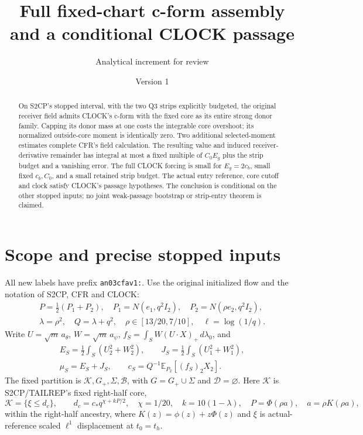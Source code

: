 \documentclass[11pt]{article}
\title{Full fixed-chart c-form assembly\\and a conditional CLOCK passage}
\author{Analytical increment for review}
\date{Version 1}
\theoremstyle{remark}\newtheorem{remark}[theorem]{Remark}
\newcommand{\E}{\mathbb E}
\newcommand{\dd}{\,d}
\newcommand{\KK}{\mathcal K}
\newcommand{\BB}{\mathcal B}
\newcommand{\Gp}{G_+}
\begin{document}
\maketitle
\begin{abstract}
On S2CP's stopped interval, with the two Q3 strips explicitly
budgeted, the original receiver field admits CLOCK's c-form with
the fixed core as its entire strong donor family. Capping its
donor mass at one costs the integrable core overshoot; its
normalized outside-core moment is identically zero. Two additional
selected-moment estimates complete CFR's field calculation.
The resulting value and induced receiver-derivative remainder
has integral at most a fixed multiple of $C_0E_g$ plus the strip
budget and a vanishing error. The full CLOCK forcing is small
for $E_g=2c_b$, small fixed $c_b,C_0$, and a small retained strip
budget. The actual entry reference, core cutoff and clock satisfy
CLOCK's passage hypotheses. The conclusion is conditional on
the other stopped inputs; no joint weak-passage bootstrap or
strip-entry theorem is claimed.
\end{abstract}

\section{Scope and precise stopped inputs}
All new labels have prefix \texttt{an03cfav1:}.
Use the original initialized flow and the notation of S2CP,
CFR and CLOCK:
\[
 \begin{gathered}
 P=\tfrac12(P_1+P_2),\quad P_1=N(e_1,q^2I_2),\quad
 P_2=N(\rho e_2,q^2I_2),\\
 \lambda=\rho^2,\quad Q=\lambda+q^2,\quad
 \rho\in[13/20,7/10],\quad\ell=\log(1/q).
 \end{gathered}
\]
Write $U=\sqrt m\,a_\theta$, $W=\sqrt m\,a_\psi$,
$f_S=\int_S W(U\cdot X)_+\dd\lambda_0$, and
\[
 \begin{gathered}
 E_S=\tfrac12\int_S(U_2^2+W_2^2),\qquad
 J_S=\tfrac12\int_S(U_1^2+W_1^2),\\
 \mu_S=E_S+J_S,\qquad
 c_S=Q^{-1}\E_{P_2}[(f_S)_2X_2].
 \end{gathered}
\]
The fixed partition is $\KK,\Gp,\Sigma,\BB$, with
$G=\Gp\cup\Sigma$ and $\mathcal D=\varnothing$.
Here $\KK$ is S2CP/TAILREP's fixed right-half core,
\begin{equation}
 \KK=\{\xi\le d_c\},\qquad
 d_c=c_*q^{\chi+kP/2},\quad \chi=1/20,\quad
 k=10(1-\lambda),\quad P=\Phi(\rho a),\quad a=\rho K(\rho a),
 \label{an03cfav1:cutoff}
\end{equation}
within the right-half ancestry, where
$K(z)=\phi(z)+z\Phi(z)$ and $\xi$ is actual-reference scaled
$\ell^1$ displacement at $t_0=t_h$.
\end{document}
